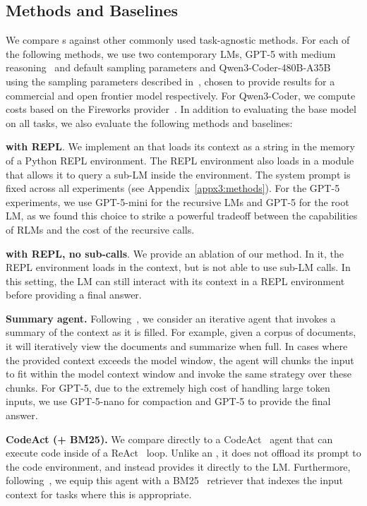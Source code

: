 \subsection{Methods and Baselines} \label{sec4.2-methods}
We compare \RLM{}s against other commonly used task-agnostic methods. For each of the following methods, we use two contemporary LMs, GPT-5 with medium reasoning~\citep{openai2025gpt5systemcard} and default sampling parameters and Qwen3-Coder-480B-A35B~\citep{yang2025qwen3technicalreport} using the sampling parameters described in~\citet{Qwen3-Coder-480B-A35B}, chosen to provide results for a commercial and open frontier model respectively. For Qwen3-Coder, we compute costs based on the Fireworks provider~\citep{Qwen3-Coder-Fireworks}. In addition to evaluating the base model on all tasks, we also evaluate the following methods and baselines:

\textbf{\RLM{} with REPL}. We implement an \RLM{} that loads its context as a string in the memory of a Python REPL environment. The REPL environment also loads in a module that allows it to query a sub-LM inside the environment. The system prompt is fixed across all experiments (see Appendix~\ref{appx3:methods}). For the GPT-5 experiments, we use GPT-5-mini for the recursive LMs and GPT-5 for the root LM, as we found this choice to strike a powerful tradeoff between the capabilities of RLMs and the cost of the recursive calls.

\textbf{\RLM{} with REPL, no sub-calls}. We provide an ablation of our method. In it, the REPL environment loads in the context, but is not able to use sub-LM calls. In this setting, the LM can still interact with its context in a REPL environment before providing a final answer.

\textbf{Summary agent.} Following~\citet{sun2025scalinglonghorizonllmagent,wu2025resumunlockinglonghorizonsearch,yu2025memagentreshapinglongcontextllm}, we consider an iterative agent that invokes a summary of the context as it is filled. For example, given a corpus of documents, it will iteratively view the documents and summarize when full. In cases where the provided context exceeds the model window, the agent will chunks the input to fit within the model context window and invoke the same strategy over these chunks. For GPT-5, due to the extremely high cost of handling large token inputs, we use GPT-5-nano for compaction and GPT-5 to provide the final answer.


\textbf{CodeAct (+ BM25).} We compare directly to a  CodeAct~\citep{wang2024executablecodeactionselicit} agent that can execute code inside of a ReAct~\citep{yao2023reactsynergizingreasoningacting} loop. Unlike an \RLM, it does not offload its prompt to the code environment, and instead provides it directly to the LM. Furthermore, following~\citet{jimenez2024swebenchlanguagemodelsresolve, chen2025browsecompplusfairtransparentevaluation}, we equip this agent with a BM25~\citep{10.1561/1500000019} retriever that indexes the input context for tasks where this is appropriate.


